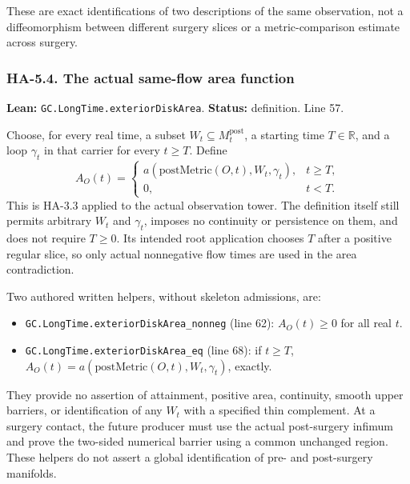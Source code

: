\documentclass[
  letterpaper,
  11pt]{article}
\providecommand{\tightlist}{%
  \setlength{\itemsep}{0pt}\setlength{\parskip}{0pt}}
\begin{document}
These are exact identifications of two descriptions of the same
observation, not a diffeomorphism between different surgery slices or a
metric-comparison estimate across surgery.

\subsubsection{HA-5.4. The actual same-flow area function}\label{ha-5-4}

\textbf{Lean:}
{\small\texttt{GC.\allowbreak{}Long\allowbreak{}Time.\allowbreak{}exterior\allowbreak{}Disk\allowbreak{}Area}}.
\textbf{Status:} definition. Line 57.

Choose, for every real time, a subset
\(W_t\subseteq M_t^{\mathrm{post}}\), a starting time \(T\in\mathbb R\),
and a loop \(\gamma_t\) in that carrier for every \(t\ge T\). Define \[
 A_O(t)=\begin{cases}
 a(\mathrm{postMetric}(O,t),W_t,\gamma_t),&t\ge T,\\
 0,&t<T.
 \end{cases}
\] This is HA-3.3 applied to the actual observation tower. The
definition itself still permits arbitrary \(W_t\) and \(\gamma_t\),
imposes no continuity or persistence on them, and does not require
\(T\ge0\). Its intended root application chooses \(T\) after a positive
regular slice, so only actual nonnegative flow times are used in the
area contradiction.

Two authored written helpers, without skeleton admissions, are:

\begin{itemize}
\tightlist
\item
  {\small\texttt{GC.\allowbreak{}Long\allowbreak{}Time.\allowbreak{}exterior\allowbreak{}Disk\allowbreak{}Area\_\allowbreak{}nonneg}}
  (line 62): \(A_O(t)\ge0\) for all real \(t\).
\item
  {\small\texttt{GC.\allowbreak{}Long\allowbreak{}Time.\allowbreak{}exterior\allowbreak{}Disk\allowbreak{}Area\_\allowbreak{}eq}}
  (line 68): if \(t\ge T\),
  \(A_O(t)=a(\mathrm{postMetric}(O,t),W_t,\gamma_t)\), exactly.
\end{itemize}

They provide no assertion of attainment, positive area, continuity,
smooth upper barriers, or identification of any \(W_t\) with a specified
thin complement. At a surgery contact, the future producer must use the
actual post-surgery infimum and prove the two-sided numerical barrier
using a common unchanged region. These helpers do not assert a global
identification of pre- and post-surgery manifolds.
\end{document}
